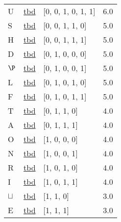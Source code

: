 \documentclass[12pt]{article}
\begin{document}
\begin{tabular}{l l l l}
U	&	\url{tbd}	&	[0, 0, 1, 0, 1, 1]	&	6.0\\
S	&	\url{tbd}	&	[0, 0, 1, 1, 0]	&	5.0\\
H	&	\url{tbd}	&	[0, 0, 1, 1, 1]	&	5.0\\
D	&	\url{tbd}	&	[0, 1, 0, 0, 0]	&	5.0\\
$\P$	&	\url{tbd}	&	[0, 1, 0, 0, 1]	&	5.0\\
L	&	\url{tbd}	&	[0, 1, 0, 1, 0]	&	5.0\\
F	&	\url{tbd}	&	[0, 1, 0, 1, 1]	&	5.0\\
T	&	\url{tbd}	&	[0, 1, 1, 0]	&	4.0\\
A	&	\url{tbd}	&	[0, 1, 1, 1]	&	4.0\\
O	&	\url{tbd}	&	[1, 0, 0, 0]	&	4.0\\
N	&	\url{tbd}	&	[1, 0, 0, 1]	&	4.0\\
R	&	\url{tbd}	&	[1, 0, 1, 0]	&	4.0\\
I	&	\url{tbd}	&	[1, 0, 1, 1]	&	4.0\\
$\sqcup$	&	\url{tbd}	&	[1, 1, 0]	&	3.0\\
E	&	\url{tbd}	&	[1, 1, 1]	&	3.0\\
\end{tabular}
\end{document}

